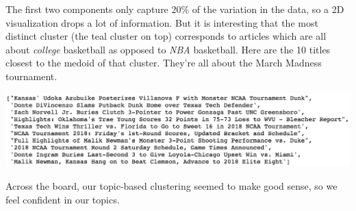 \documentclass[11pt]{article}
\begin{document}
The first two components only capture 20\% of the variation in the data, so a 2D visualization drops a lot of information.  But it is interesting that the most distinct cluster (the teal cluster on top) corresponds to articles which are all about \textit{college} basketball as opposed to \textit{NBA} basketball. Here are the 10 titles closest to the medoid of that cluster.  They're all about the March Madness tournament. 

\includegraphics[width=400pt]{college_medoid_closest10.png} 

Across the board, our topic-based clustering seemed to make good sense, so we feel confident in our topics. 




 
 
\end{document}
